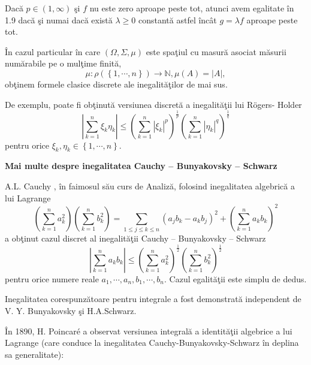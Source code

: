 \documentclass[a4paper,12pt,oneside]{report}
\begin{document}
  Dac\u{a} \(p \in \left ( 1 , \infty  \right )\) \c{s}i \(f\) nu este zero aproape peste tot, atunci avem egalitate \^{i}n 1.9 dac\u{a} \c{s}i numai dac\u{a} exist\u{a}  \(\lambda \geq 0\) constant\u{a} astfel \^{i}nc\^{a}t \(g = \lambda f\) aproape peste tot.

  \^{I}n  cazul particular \^{i}n care \(\left ( \Omega , \Sigma, \mu \right )\) este spa\c{t}iul cu masur\u{a} asociat m\u{a}surii num\u{a}rabile pe o mul\c{t}ime finit\u{a}, \[\mu  : \rho \left ( \left \{ 1,\cdots, n \right \} \right )\rightarrow \mathbb{N}, \mu \left ( A \right ) = \left | A \right |,\]
ob\c{t}inem formele clasice discrete ale inegalit\u{a}\c{t}ilor de mai sus.

De exemplu, poate fi ob\c{t}inut\u{a} versiunea discret\u{a} a inegalit\u{a}\c{t}ii lui R\"{o}gers- Holder
\begin{displaymath}
  \left | \sum_{k=1}^{n} \xi _{k}\eta _{k}\right |\leq \left ( \sum_{k = 1}^{n}\left | \xi _{k}\right |^{p}  \right )^{\frac{1}{p}}\left ( \sum_{k = 1}^{n} \left | \eta _{k} \right |^{q}\right )^{\frac{1}{q}}
\end{displaymath}
pentru  orice \(\xi _{k}, \eta _{k} \in \left \{ 1,\cdots,n \right \}.\)




\textbf{Mai multe despre inegalitatea Cauchy – Bunyakovsky – Schwarz}

A.L. Cauchy , \^{i}n faimosul s\u{a}u curs de Analiz\u{a}, folosind inegalitatea algebric\u{a} a  lui Lagrange
\begin{displaymath}
  \left ( \sum_{k = 1}^{n} a_{k}^{2}\right )\left ( \sum_{k = 1}^{n} b_{k}^{2}\right ) =  \sum_{1\leq j\leq k\leq n}\left ( a_{j}b_{k} - a_{k}b_{j} \right )^{2} + \left ( \sum_{k = 1}^{n} a_{k}b_{k}\right )^{2}
\end{displaymath}
a ob\c{t}inut cazul discret al inegalit\u{a}\c{t}ii Cauchy – Bunyakovsky – Schwarz
\begin{displaymath}
  \left | \sum_{k = 1}^{n} a_{k}b_{k} \right |\leq \left ( \sum_{k = 1}^{n}a_{k}^{2} \right )^{\frac{1}{2}}\left ( \sum_{k = 1}^{n}b_{k}^{2} \right )^{\frac{1}{2}}
\end{displaymath}
pentru orice numere reale \(a_{1},\cdots,a_{n}, b_{1},\cdots, b_{n}\). Cazul egalit\u{a}\c{t}ii este simplu de dedus.

Inegalitatea corespunz\u{a}toare pentru integrale a fost demonstrat\u{a} independent de V. Y. Bunyakovsky \c{s}i H.A.Schwarz.

  \^{I}n 1890, H. Poincar\'{e} a observat versiunea integral\u{a} a identit\u{a}\c{t}ii algebrice a lui Lagrange (care conduce la inegalitatea Cauchy-Bunyakovsky-Schwarz \^{i}n deplina sa generalitate):
\end{document}
